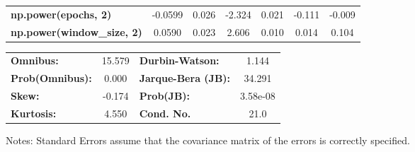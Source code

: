 \begin{center}
\begin{tabular}{lcccccc}
\textbf{np.power(epochs, 2)}         &      -0.0599  &        0.026     &    -2.324  &         0.021        &       -0.111    &       -0.009     \\
\textbf{np.power(window\_size, 2)}   &       0.0590  &        0.023     &     2.606  &         0.010        &        0.014    &        0.104     \\
\bottomrule
\end{tabular}
\begin{tabular}{lclc}
\textbf{Omnibus:}       & 15.579 & \textbf{  Durbin-Watson:     } &    1.144  \\
\textbf{Prob(Omnibus):} &  0.000 & \textbf{  Jarque-Bera (JB):  } &   34.291  \\
\textbf{Skew:}          & -0.174 & \textbf{  Prob(JB):          } & 3.58e-08  \\
\textbf{Kurtosis:}      &  4.550 & \textbf{  Cond. No.          } &     21.0  \\
\bottomrule
\end{tabular}
\end{center}

Notes: \newline
 [1] Standard Errors assume that the covariance matrix of the errors is correctly specified.
